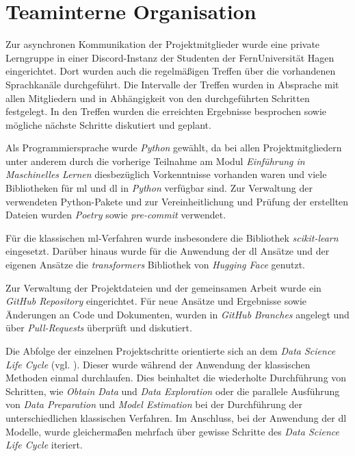 \section{Teaminterne Organisation}\label{sec:teaminterneorganisation}

Zur asynchronen Kommunikation der Projektmitglieder wurde eine private Lerngruppe in einer Discord-Instanz der Studenten der FernUniversität Hagen eingerichtet.
Dort wurden auch die regelmäßigen Treffen über die vorhandenen Sprachkanäle durchgeführt.
Die Intervalle der Treffen wurden in Absprache mit allen Mitgliedern und in Abhängigkeit von den durchgeführten Schritten festgelegt.
In den Treffen wurden die erreichten Ergebnisse besprochen sowie mögliche nächste Schritte diskutiert und geplant.

Als Programmiersprache wurde \textit{Python} gewählt, da bei allen Projektmitgliedern unter anderem durch die vorherige Teilnahme am Modul \textit{Einführung in Maschinelles Lernen} diesbezüglich Vorkenntnisse vorhanden waren und viele Bibliotheken für \gls{ml} und \gls{dl} in \textit{Python} verfügbar sind.
Zur Verwaltung der verwendeten Python-Pakete und zur Vereinheitlichung und Prüfung der erstellten Dateien wurden \textit{Poetry} \cite{poetry2025} sowie \textit{pre-commit} \cite{precommit2025} verwendet.

Für die klassischen \gls{ml}-Verfahren wurde insbesondere die Bibliothek \textit{scikit-learn} eingesetzt.
Darüber hinaus wurde für die Anwendung der \gls{dl} Ansätze und der eigenen Ansätze die \textit{transformers} Bibliothek von \textit{Hugging Face} genutzt.

Zur Verwaltung der Projektdateien und der gemeinsamen Arbeit wurde ein \textit{GitHub Repository} \cite{githubrepo2025} eingerichtet.
Für neue Ansätze und Ergebnisse sowie Änderungen an Code und Dokumenten, wurden in \textit{GitHub} \textit{Branches} angelegt und über \textit{Pull-Requests} überprüft und diskutiert.

Die Abfolge der einzelnen Projektschritte orientierte sich an dem \textit{Data Science Life Cycle} (vgl. \cite[Abb. 2]{Stodden2020}).
Dieser wurde während der Anwendung der klassischen Methoden einmal durchlaufen.
Dies beinhaltet die wiederholte Durchführung von Schritten, wie \textit{Obtain Data} und \textit{Data Exploration} oder die parallele Ausführung von \textit{Data Preparation} und \textit{Model Estimation} bei der Durchführung der unterschiedlichen klassischen Verfahren.
Im Anschluss, bei der Anwendung der \gls{dl} Modelle, wurde gleichermaßen mehrfach über gewisse Schritte des \textit{Data Science Life Cycle} iteriert.
